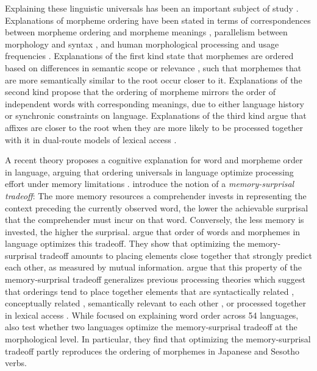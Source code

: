 \documentclass[11pt,letterpaper]{article}
\newcommand{\citep}{\parencite}
\newcommand{\citet}{\Textcite}
\newcommand{\jd}[1]{\textcolor{Pink}{[jd: #1]}}
\begin{document}
Explaining these linguistic universals has been an important subject of study \citep{bybee-morphology-1985, spencer2006linguistic, manova2010modeling, bauer2010an, rice2011principles,hay2004what}.
Explanations of morpheme ordering have been stated in terms of correspondences between morpheme ordering and morpheme meanings \citep{bybee-morphology-1985,rice2000morpheme,saldana2021cross}, parallelism between morphology and syntax \citep{givon1971historical,venneman1973explanation,baker1985the}, and human morphological processing and usage frequencies \citep{hay2002speech, plag2002the, inkelas2016affix}.
Explanations of the first kind state that morphemes are ordered based on differences in semantic scope \citep{rice2000morpheme} or relevance \citep{bybee-morphology-1985}, such that morphemes that are more semantically similar to the root occur closer to it.
Explanations of the second kind propose that the ordering of morpheme mirrors the order of independent words with corresponding meanings, due to either language history or synchronic constraints on language.
Explanations of the third kind argue that affixes are closer to the root when they are more likely to be processed together with it in dual-route models of lexical access \citep{baayen-frequency-1993}.

A recent theory proposes a cognitive explanation for word and morpheme order in language, arguing that ordering universals in language optimize processing effort under memory limitations \citep{Hahn2020modeling}.
\citet{Hahn2020modeling} introduce the notion of a \emph{memory-surprisal tradeoff}: The more memory resources a comprehender invests in representing the context preceding the currently observed word, the lower the achievable surprisal that the comprehender must incur on that word. Conversely, the less memory is invested, the higher the surprisal.
\citet{Hahn2020modeling} argue that order of words and morphemes in language optimizes this tradeoff.
They show that optimizing the memory-surprisal tradeoff amounts to placing elements close together that strongly predict each other, as measured by mutual information.
\citet{Hahn2020modeling} argue that this property of the memory-surprisal tradeoff generalizes previous processing theories which suggest that orderings tend to place together elements that are syntactically related \citep{rijkhoff-word-1986, hawkins-performance-1994}, conceptually related \citep{givon1985iconicity}, semantically relevant to each other \citep{bybee-morphology-1985}, or processed together in lexical access \citep{hay2004what}.
While focused on explaining word order across 54 languages, \citet{Hahn2020modeling} also test whether two languages optimize the memory-surprisal tradeoff at the morphological level. In particular, they find that optimizing the memory-surprisal tradeoff partly reproduces the ordering of morphemes in Japanese and Sesotho verbs.
\end{document}
